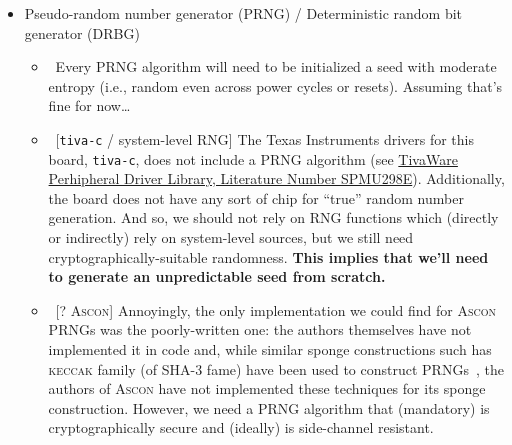 \begin{itemize}
\begin{itemize}
\begin{itemize}
        \end{itemize}
    \end{itemize}
    \item Pseudo-random number generator (PRNG) / Deterministic random bit generator (DRBG)
    \begin{itemize}
        \item\ Every PRNG algorithm will need to be initialized a seed with moderate entropy (i.e., random even across power cycles or resets). Assuming that's fine for now\dots
        \item\ [\xmark\xmark\xmark \texttt{tiva-c} / system-level RNG] The Texas Instruments drivers for this board, \texttt{tiva-c}, does not include a PRNG algorithm (see \href{https://drive.google.com/file/d/1bJn0p1VEi76f8Ozd0EeNZcn6_i-o7chI/view}{TivaWare Perhipheral Driver Library, Literature Number SPMU298E}). Additionally, the board does not have any sort of chip for ``true'' random number generation. And so, we should not rely on RNG functions which (directly or indirectly) rely on system-level sources, but we still need cryptographically-suitable randomness. \textbf{This implies that we'll need to generate an unpredictable seed from scratch.}
        \item\ [? A\textsc{scon}] Annoyingly, the only implementation we could find for A\textsc{scon} PRNGs was the poorly-written one: the authors themselves have not implemented it in code and, while similar sponge constructions such has \textsc{keccak} family (of SHA-3 fame) have been used to construct PRNGs~\cite{CHES:BDPV10, EC:GazTes16}, the authors of A\textsc{scon} have not implemented these techniques for its sponge construction. However, we need a PRNG algorithm that (mandatory) is cryptographically secure and (ideally) is side-channel resistant.
        

\end{itemize}
\end{itemize}
